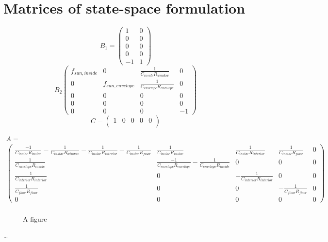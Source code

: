 \section{Matrices of state-space formulation}
\label{sec:appendix:Matrizen}
    
    \begin{equation}
    B_1 = 
    \begin{pmatrix}
        1 & 0 \\
        0 & 0 \\
        0 & 0 \\
        0 & 0 \\
        -1 & 1 
    \end{pmatrix}
    \end{equation}
    \begin{equation}
	B_2
	\begin{pmatrix}
         f_{sun,inside} & 0 & \frac{1}{C_{inside}R_{window}} & 0\\
         0 & f_{sun,envelope} & \frac{1}{C_{envelope}R_{envelope}}&0\\
         0 & 0 & 0& 0\\
         0 & 0 & 0& 0\\
         0 & 0 & 0 & -1
    \end{pmatrix}
	\end{equation}
	\begin{equation}
	    C = 
	    \begin{pmatrix}
        1 & 0 & 0 & 0 & 0 \\
        \end{pmatrix}
	\end{equation}
	\begin{landscape}
	\begin{align} 
	A = \nonumber \\ 
	\begin{pmatrix}
    \frac{-1}{C_{inside}R_{inside}}-\frac{1}{C_{inside}R_{window}}-\frac{1}{C_{inside}R_{interior}}-\frac{1}{C_{inside}R_{floor}}   & \frac{1}{C_{inside}R_{inside}} & \frac{1}{C_{inside}R_{interior}} & \frac{1}{C_{inside}R_{floor}} & 0 \\
    \frac{1}{C_{envelope}R_{inside}}& \frac{-1}{C_{envelope}R_{envelope}}- \frac{1}{C_{envelope}R_{inside}} & 0 & 0 & 0 \\
    \frac{1}{C_{interior}R_{interior}} & 0 & -\frac{1}{C_{interior}R_{interior}} & 0 &0 \\
    \frac{1}{C_{floor}R_{floor}} & 0 & 0 & -\frac{1}{C_{floor}R_{floor}} &0 \\
    0 & 0 & 0 & 0 & 0
    \end{pmatrix} \nonumber\\ 
    \end{align}
    \end{landscape}



\setcounter{figure}{0}
		
\begin{figure} [ht]
  \centering
  \caption{A figure}
  \label{fig:anotherfigure}
\end{figure}


\dots